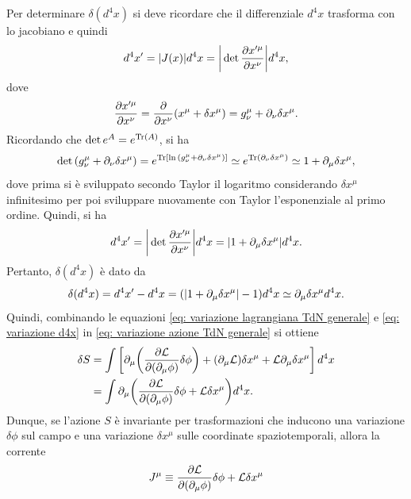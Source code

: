 Per determinare $\delta(d^4x)$ si deve ricordare che il differenziale $d^4x$ trasforma con lo jacobiano e quindi
\begin{equation}
    d^4x' = |J(x)|d^4x = \bigg|\det{\frac{\partial x'^\mu}{\partial x^\nu}}\bigg|d^4x,
\end{equation}
dove 
\begin{equation}
    \frac{\partial x'^\mu}{\partial x^\nu} = \frac{\partial}{\partial x^\nu}(x^\mu + \delta x^\mu) = g^\mu_\nu + \partial_\nu\delta x^\mu.
\end{equation}
Ricordando che $\det{e^A} = e^{\textnormal{Tr}{(A)}}$, si ha
\begin{equation}
    \det{(g^\mu_\nu + \partial_\nu\delta x^\mu)} = e^{\textnormal{Tr}{[\ln{(g^\mu_\nu + \partial_\nu\delta x^\mu)}]}} \simeq e^{\textnormal{Tr}{(\partial_\nu\delta x^\mu)}} \simeq 1 + \partial_\mu\delta x^\mu,
\end{equation}
dove prima si è sviluppato secondo Taylor il logaritmo considerando $\delta x^\mu$ infinitesimo per poi sviluppare nuovamente con Taylor l'esponenziale al primo ordine. Quindi, si ha
\begin{equation}
    d^4x' = \bigg|\det{\frac{\partial x'^\mu}{\partial x^\nu}}\bigg|d^4x = |1+\partial_\mu\delta x^\mu|d^4x.
\end{equation}
Pertanto, $\delta(d^4x)$ è dato da
\begin{equation}
\label{eq: variazione d4x}
    \delta(d^4x) = d^4x' - d^4x = (|1+\partial_\mu\delta x^\mu| - 1)d^4x \simeq \partial_\mu\delta x^\mu d^4x.
\end{equation}
Quindi, combinando le equazioni \eqref{eq: variazione lagrangiana TdN generale} e \eqref{eq: variazione d4x} in \eqref{eq: variazione azione TdN generale} si ottiene
\begin{equation}
    \begin{split}
        \delta S &= \int \bigg[\partial_\mu\bigg(\frac{\partial\mathcal{L}}{\partial(\partial_\mu\phi)}\delta\phi\bigg) + (\partial_\mu\mathcal{L})\delta x^\mu + \mathcal{L}\partial_\mu\delta x^\mu \bigg]\,d^4x \\
        &= \int \partial_\mu\bigg(\frac{\partial\mathcal{L}}{\partial(\partial_\mu\phi)}\delta\phi + \mathcal{L}\delta x^\mu\bigg)d^4x.
    \end{split}
\end{equation}
Dunque, se l'azione $S$ è invariante per trasformazioni che inducono una variazione $\delta\phi$ sul campo e una variazione $\delta x^\mu$ sulle coordinate spaziotemporali, allora la corrente 
\begin{equation}
\label{eq: corrente TdN generale}
    J^\mu \equiv \frac{\partial\mathcal{L}}{\partial(\partial_\mu\phi)}\delta\phi + \mathcal{L}\delta x^\mu
\end{equation}
